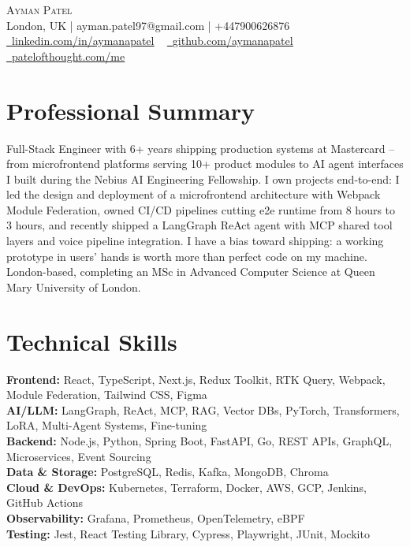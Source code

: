 \documentclass[letterpaper,11pt]{article}
\begin{document}
    \begin{center}
        {\Huge\scshape Ayman Patel}
        \\ London, UK | ayman.patel97@gmail.com | +447900626876 \\
        \small
        \href{https://linkedin.com/in/aymanapatel}{\raisebox{-0.2\height}\faLinkedin\ \underline{linkedin.com/in/aymanapatel}}  ~
        \href{https://github.com/aymanapatel}{\raisebox{-0.2\height}\faGithub\ \underline{github.com/aymanapatel}}  ~
        \href{https://patelofthought.com/me}{\raisebox{-0.2\height}\faGlobe\ \underline{patelofthought.com/me}}
    \end{center}

\section{Professional Summary}
\small
Full-Stack Engineer with 6+ years shipping production systems at Mastercard -- from microfrontend platforms serving 10+ product modules to AI agent interfaces I built during the Nebius AI Engineering Fellowship. I own projects end-to-end: I led the design and deployment of a microfrontend architecture with Webpack Module Federation, owned CI/CD pipelines cutting e2e runtime from 8 hours to 3 hours, and recently shipped a LangGraph ReAct agent with MCP shared tool layers and voice pipeline integration. I have a bias toward shipping: a working prototype in users' hands is worth more than perfect code on my machine. London-based, completing an MSc in Advanced Computer Science at Queen Mary University of London.

\section{Technical Skills}
\vspace{-7pt}
\begin{itemize}[leftmargin=0.15in, label={}]\small{\item{
\textbf{Frontend:}{ React, TypeScript, Next.js, Redux Toolkit, RTK Query, Webpack, Module Federation, Tailwind CSS, Figma} \\
\textbf{AI/LLM:}{ LangGraph, ReAct, MCP, RAG, Vector DBs, PyTorch, Transformers, LoRA, Multi-Agent Systems, Fine-tuning} \\
\textbf{Backend:}{ Node.js, Python, Spring Boot, FastAPI, Go, REST APIs, GraphQL, Microservices, Event Sourcing} \\
\textbf{Data \& Storage:}{ PostgreSQL, Redis, Kafka, MongoDB, Chroma} \\
\textbf{Cloud \& DevOps:}{ Kubernetes, Terraform, Docker, AWS, GCP, Jenkins, GitHub Actions} \\
\textbf{Observability:}{ Grafana, Prometheus, OpenTelemetry, eBPF} \\
\textbf{Testing:}{ Jest, React Testing Library, Cypress, Playwright, JUnit, Mockito}
}}
\end{itemize}
\end{document}
